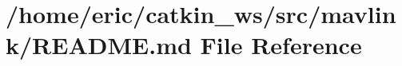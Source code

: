 \hypertarget{mavlink_2README_8md}{}\section{/home/eric/catkin\+\_\+ws/src/mavlink/\+R\+E\+A\+D\+ME.md File Reference}
\label{mavlink_2README_8md}

